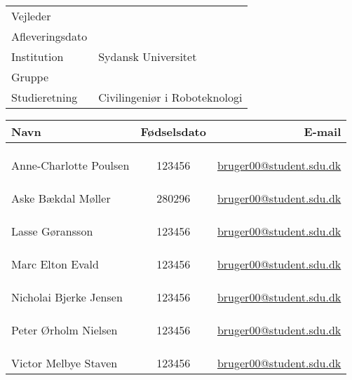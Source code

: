 \documentclass[../main.tex]{subfiles}
\begin{document}
\phantom{g}
\vspace{0.5cm}
\noindent
\begin{center}
\begin{Huge}
\textbf{\titel}
\end{Huge}
\\
\begin{huge}
\subtitel
\end{huge}
\\
\vspace{1cm}



\vspace{.7cm}

\begin{tabular}{@{} l l @{}}
\hline
Vejleder         		&	\vejleder          	\\
Afleveringsdato 			& 	\dato				\\
Institution             	&   Sydansk Universitet	\\
Gruppe                  	&	\gruppe				\\
Studieretning           	& 	Civilingeniør i Roboteknologi	\\
\hline
\end{tabular}
\thispagestyle{empty}

\vspace{1.5cm}


\newcommand{\fmedlem}[3]{%
\multicolumn{3}{c}{}\\
\multicolumn{3}{c}{}\\
\multicolumn{3}{c}{}\\
\hline
#1 & #2 & 	\href{mailto:#3@student.sdu.dk}{#3@student.sdu.dk}\\
}

\begin{tabular}{ l  c  r }

Navn						& Fødselsdato &	E-mail \\ 
\hline
\fmedlem{Anne-Charlotte Poulsen}{123456}{bruger00}
\fmedlem{Aske Bækdal Møller}{280296}{bruger00}
\fmedlem{Lasse Gøransson}{123456}{bruger00}
\fmedlem{Marc Elton Evald}{123456}{bruger00}
\fmedlem{Nicholai Bjerke Jensen}{123456}{bruger00}
\fmedlem{Peter Ørholm Nielsen}{123456}{bruger00}
\fmedlem{Victor Melbye Staven}{123456}{bruger00}
\end{tabular}
\end{center}
\end{document}

